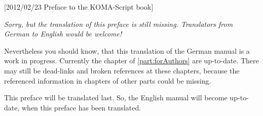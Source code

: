 %
%
%
%
%
%
%
%
%

[2012/02/23 Preface to the KOMA-Script book]



\emph{Sorry, but the translation of this preface is still missing. Translators
  from German to English would be welcome!}

Nevertheless you should know, that this translation of the German
\KOMAScript{} manual is a work in progress. Currently the chapter of
\autoref{part:forAuthors} are up-to-date.  There may still be dead-links and
broken references at these chapters, because the referenced information in
chapters of other parts could be missing.

This preface will be translated last. So, the English manual will become
up-to-date, when this preface has been translated.

\endinput

